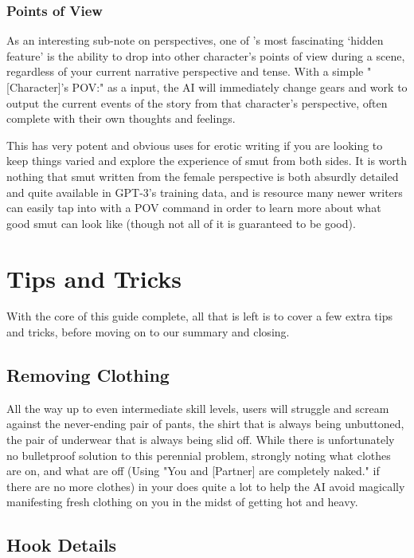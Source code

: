 ﻿\documentclass[Coomer-main.tex]{subfiles}
\begin{document}
\subsection{Points of View}

As an interesting sub-note on perspectives, one of \aid's most fascinating ‘hidden feature’ is the ability to drop into other character's points of view during a scene, regardless of your current narrative perspective and tense.
With a simple "[Character]'s POV:" as a \story  input, the AI will immediately change gears and work to output the current events of the story from that character's perspective, often complete with their own thoughts and feelings.

This has very potent and obvious uses for erotic writing if you are looking to keep things varied and explore the experience of smut from both sides.
It is worth nothing that smut written from the female perspective is both absurdly detailed and quite available in GPT-3's training data, and is resource many newer writers can easily tap into with a POV command in order to learn more about what good smut can look like (though not all of it is guaranteed to be good).

\chapter{Tips and Tricks}
\label{ch:tips}

With the core of this guide complete, all that is left is to cover a few extra tips and tricks, before moving on to our summary and closing.

\section{Removing Clothing}

All the way up to even intermediate skill levels, users will struggle and scream against the never-ending pair of pants, the shirt that is always being unbuttoned, the pair of underwear that is always being slid off.
While there is unfortunately no bulletproof solution to this perennial problem, strongly noting what clothes are on, and what are off (Using "You and [Partner] are completely naked." if there are no more clothes) in your \rem does quite a lot to help the AI avoid magically manifesting fresh clothing on you in the midst of getting hot and heavy.

\section{Hook Details}
\end{document}
